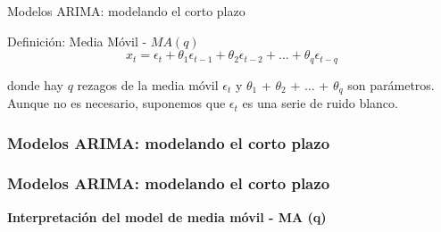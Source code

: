 \documentclass[spanish,xcolor=table]{beamer}
\begin{document}
\begin{section}{Modelos ARIMA: modelando el corto plazo}
\begin{frame}
{\begin{block}{Definici\'on: Media M\'ovil - $MA (q)$}
\begin{equation}
x_t = \epsilon_t + \theta_1 \epsilon_{t-1} +  \theta_2 \epsilon_{t-2} + \dots{} +  \theta_q \epsilon_{t-q} 
\end{equation}

donde hay $q$ rezagos de la media m\'ovil $\epsilon_t$ y $\theta_1$  + $ \theta_2$ + $\dots{}$ + $ \theta_q$ son par\'ametros. \\
\vspace{4mm}	
Aunque no es necesario, suponemos que $\epsilon_t$ es una serie de ruido blanco.

\end{block}
}
 
\end{frame}

\begin{frame}
\frametitle{Modelos ARIMA: modelando el corto plazo}

 
\end{frame}


\begin{frame}
\frametitle{Modelos ARIMA: modelando el corto plazo}

\textbf{Interpretaci\'on del model de media m\'ovil - MA (q)}


\end{frame}
\end{section}
\end{document}
